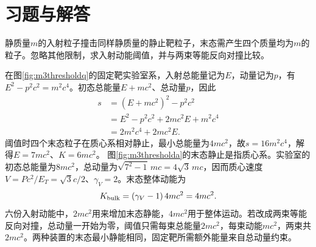 \section{习题与解答}


\begin{exercise}\label{ex:m3threshold}
静质量$m$的入射粒子撞击同样静质量的静止靶粒子，末态需产生四个质量均为$m$的粒子。忽略其他限制，求入射动能阈值，并与两束等能反向对撞比较。
\end{exercise}
\begin{solution}
在图\ref{fig:m3thresholdq}的固定靶实验室系，入射总能量记为$E$，动量记为$p$，有$E^2-p^2c^2=m^2c^4$。初态总能量$E+mc^2$、总动量$p$，因此
\begin{align*}
 s&=(E+mc^2)^2-p^2c^2\\
 &=E^2-p^2c^2+2mc^2E+m^2c^4\\
 &=2m^2c^4+2mc^2E.
\end{align*}
阈值时四个末态粒子在质心系相对静止，最小总能量为$4mc^2$，故$s=16m^2c^4$，解得$E=7mc^2$、$K=6mc^2$。
图\ref{fig:m3thresholda}的末态静止是指质心系。实验室的初态总能量为$8mc^2$，总动量为$\sqrt{7^2-1}\,mc=4\sqrt3\,mc$，因而质心速度$V=Pc^2/E_T=\sqrt3c/2$、$\gamma_V=2$。末态整体动能为
\[
 K_{\rm bulk}=(\gamma_V-1)\,4mc^2=4mc^2.
\]
六份入射动能中，$2mc^2$用来增加末态静能，$4mc^2$用于整体运动。若改成两束等能反向对撞，总动量一开始为零，阈值只需每束总能量$2mc^2$，每束动能$mc^2$，两束共$2mc^2$。两种装置的末态最小静能相同，固定靶所需额外能量来自总动量约束。
\end{solution}

